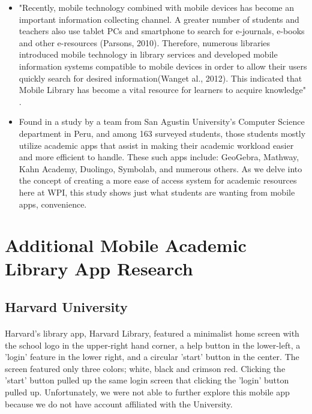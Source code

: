 \begin{itemize}
        \item
        "Recently, mobile technology combined with mobile devices has become an important information collecting channel. A greater number of students and teachers also use tablet PCs and smartphone to search for e-journals, e-books and other e-resources  (Parsons,  2010).  Therefore,  numerous  libraries  introduced  mobile technology in library services and developed mobile information systems compatible to mobile devices in order to allow their users quickly search for desired information(Wanget al., 2012). This indicated that Mobile Library has become a vital resource for learners to acquire knowledge" \cite{pu_chiu_chen_huang_2015}.
        \item
        Found in a study by a team from San Agustin University's Computer Science department in Peru, and among 163 surveyed students, those students mostly utilize academic apps that assist in making their academic workload easier and more efficient to handle. These such apps include: GeoGebra, Mathway, Kahn Academy, Duolingo, Symbolab, and numerous others. As we delve into the concept of creating a more ease of access system for academic resources here at WPI, this study shows just what students are wanting from mobile apps, convenience.\cite {Educational_Apps}
    \end{itemize}
    
    
    
\section{Additional Mobile Academic Library App Research}
        \subsection{Harvard University}
            \paragraph{}
            Harvard's library app, Harvard Library, featured a minimalist home screen with the school logo in the upper-right hand corner, a help button in the lower-left, a 'login' feature in the lower right, and a circular 'start' button in the center. The screen featured only three colors; white, black and crimson red. Clicking the 'start' button pulled up the same login screen that clicking the 'login' button pulled up.  Unfortunately, we were not able to further explore this mobile app because we do not have account affiliated with the University.
